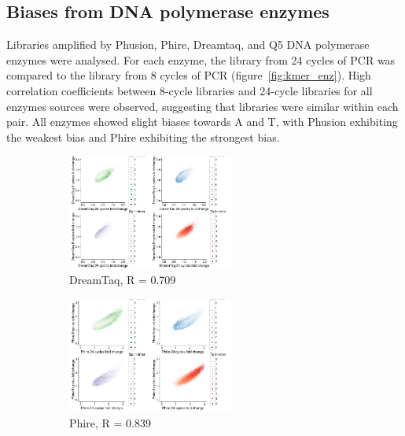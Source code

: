 \documentclass[parskip=full, numbers=noenddot]{scrbook}
\begin{document}
\subsection{Biases from DNA polymerase enzymes}
\label{ssec:pcrbias_result_enz}

Libraries amplified by Phusion, Phire, Dreamtaq, and Q5 DNA polymerase enzymes were analysed.  For each enzyme, the library from 24 cycles of PCR was compared to the library from 8 cycles of PCR (figure~\ref{fig:kmer_enz}).  High correlation coefficients between 8-cycle libraries and 24-cycle libraries for all enzymes sources were observed, suggesting that libraries were similar within each pair.  All enzymes showed slight biases towards A and T, with Phusion exhibiting the weakest bias and Phire exhibiting the strongest bias.

\begin{figure}[htb]
  \centering
  \begin{subfigure}[htb]{0.6\textwidth}
    \centering
    \includegraphics[width=0.6\textwidth]{kmer_dreamtaq}
    \caption{DreamTaq, R = 0.709}
    \label{fig:kmer_enz_dreamtaq}
  \end{subfigure}
  \begin{subfigure}[htb]{0.6\textwidth}
    \centering
    \includegraphics[width=0.6\textwidth]{kmer_phire}
    \caption{Phire, R = 0.839}
    \label{fig:kmer_enz_phire}
  \end{subfigure}
  \begin{subfigure}[htb]{0.6\textwidth}

\end{subfigure}
\end{figure}
\end{document}
